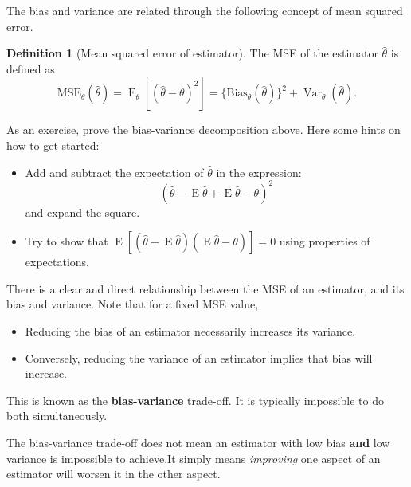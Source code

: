 \documentclass[
]{book}
\DeclareMathOperator{\E}{E}
\DeclareMathOperator{\Var}{Var}
\theoremstyle{definition}
\newtheorem{definition}{Definition}[chapter]
\theoremstyle{definition}
\theoremstyle{definition}
\theoremstyle{definition}
\theoremstyle{remark}
\begin{document}
The bias and variance are related through the following concept of mean squared error.

\begin{definition}[Mean squared error of estimator]
The MSE of the estimator \(\hat\theta\) is defined as
\[\text{MSE}_\theta(\hat\theta) = \E_\theta\left[(\hat\theta - \theta)^2 \right] = \{\text{Bias}_\theta(\hat\theta) \}^2 + \Var_\theta(\hat\theta).\]
\end{definition}

As an exercise, prove the bias-variance decomposition above. Here some hints on how to get started:

\begin{itemize}
\item
  Add and subtract the expectation of \(\hat\theta\) in the expression:
  \[
  \left(\hat\theta - \E\hat\theta + \E\hat\theta - \theta\right)^2
  \]
  and expand the square.
\item
  Try to show that \(\E\left[(\hat\theta-\E\hat\theta)(\E\hat\theta-\theta)\right]=0\) using properties of expectations.
\end{itemize}

There is a clear and direct relationship between the MSE of an estimator, and its bias and variance.
Note that for a fixed MSE value,

\begin{itemize}
\item
  Reducing the bias of an estimator necessarily increases its variance.
\item
  Conversely, reducing the variance of an estimator implies that bias will increase.
\end{itemize}

This is known as the \textbf{bias-variance} trade-off.
It is typically impossible to do both simultaneously.

The bias-variance trade-off does not mean an estimator with low bias \textbf{and} low variance is impossible to achieve.It simply means \emph{improving} one aspect of an estimator will worsen it in the other aspect.
\end{document}
